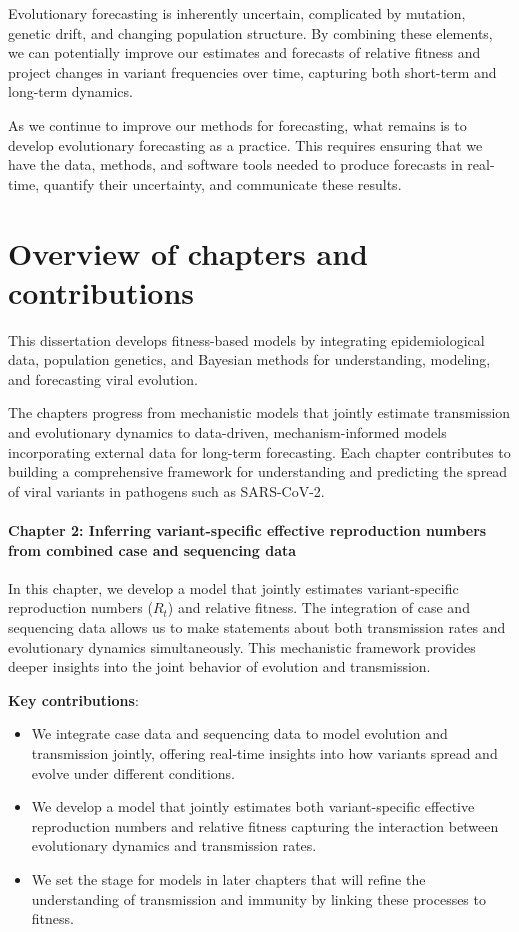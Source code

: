 Evolutionary forecasting is inherently uncertain, complicated by mutation, genetic drift, and changing population structure.
By combining these elements, we can potentially improve our estimates and forecasts of relative fitness and project changes in variant frequencies over time, capturing both short-term and long-term dynamics.

As we continue to improve our methods for forecasting, what remains is to develop evolutionary forecasting as a practice.
This requires ensuring that we have the data, methods, and software tools needed to produce forecasts in real-time, quantify their uncertainty, and communicate these results.

\section{Overview of chapters and contributions}

This dissertation develops fitness-based models by integrating epidemiological data, population genetics, and Bayesian methods for understanding, modeling, and forecasting viral evolution. 

The chapters progress from mechanistic models that jointly estimate transmission and evolutionary dynamics to data-driven, mechanism-informed models incorporating external data for long-term forecasting.
Each chapter contributes to building a comprehensive framework for understanding and predicting the spread of viral variants in pathogens such as SARS-CoV-2.

\paragraph{Chapter 2: Inferring variant-specific effective reproduction numbers from combined case and sequencing data}

In this chapter, we develop a model that jointly estimates variant-specific reproduction numbers ($R_t$) and relative fitness.
The integration of case and sequencing data allows us to make statements about both transmission rates and evolutionary dynamics simultaneously.
This mechanistic framework provides deeper insights into the joint behavior of evolution and transmission.

\noindent\textbf{Key contributions}:
\begin{itemize}
  \item We integrate case data and sequencing data to model evolution and transmission jointly, offering real-time insights into how variants spread and evolve under different conditions.
  \item We develop a model that jointly estimates both variant-specific effective reproduction numbers and relative fitness capturing the interaction between evolutionary dynamics and transmission rates.
  \item We set the stage for models in later chapters that will refine the understanding of transmission and immunity by linking these processes to fitness.
\end{itemize}

